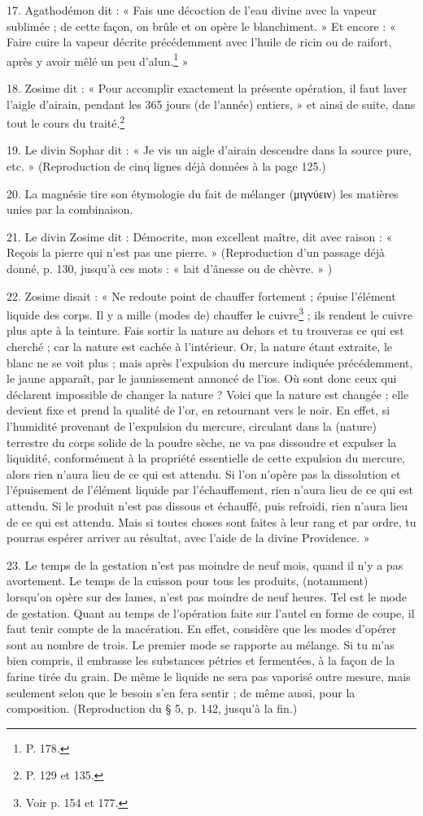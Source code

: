\documentclass[a4paper, 11pt, oneside, polutonikogreek, french]{article}
\begin{document}
17. Agathodémon dit : « Fais une décoction de l'eau divine avec la vapeur sublimée ; de cette façon, on brûle et on opère le blanchiment. » Et encore : « Faire cuire la vapeur décrite précédemment avec l'huile de ricin ou de raifort, après y avoir mêlé un peu d'alun.\footnote{P. 178.} »

18. Zosime dit : « Pour accomplir exactement la présente opération, il faut laver l'aigle d'airain, pendant les 365 jours (de l'année) entiers, » et ainsi de suite, dans tout le cours du traité.\footnote{P. 129 et 135.}

19. Le divin Sophar dit : « Je vis un aigle d'airain descendre dans la source pure, etc. » (Reproduction de cinq lignes déjà données à la page 125.)

20. La magnésie tire son étymologie du fait de mélanger (μιγνύειν) les matières unies par la combinaison.

21. Le divin Zosime dit : Démocrite, mon excellent maître, dit avec raison : « Reçois la pierre qui n'est pas une pierre. » (Reproduction d'un passage déjà donné, p. 130, jusqu'à ces mots : « lait d'ânesse ou de chèvre. » )

22. Zosime disait : « Ne redoute point de chauffer fortement ; épuise l'élément liquide des corps. Il y a mille (modes de) chauffer le cuivre\footnote{Voir p. 154 et 177.} ; ils rendent le cuivre plus apte à la teinture. Fais sortir la nature au dehors et tu trouveras ce qui est cherché ; car la nature est cachée à l'intérieur. Or, la nature étant extraite, le blanc ne se voit plus ; mais après l'expulsion du mercure indiquée précédemment, le jaune apparaît, par le jaunissement annoncé de l'ios. Où sont donc ceux qui déclarent impossible de changer la nature ? Voici que la nature est changée ; elle devient fixe et prend la qualité de l'or, en retournant vers le noir. En effet, si l'humidité provenant de l'expulsion du mercure, circulant dans la (nature) terrestre du corps solide de la poudre sèche, ne va pas dissoudre et expulser la liquidité, conformément à la propriété essentielle de cette expulsion du mercure, alors rien n'aura lieu de ce qui est attendu. Si l'on n'opère pas la dissolution et l'épuisement de l'élément liquide par l'échauffement, rien n'aura lieu de ce qui est attendu. Si le produit n'est pas dissous et échauffé, puis refroidi, rien n'aura lieu de ce qui est attendu. Mais si toutes choses sont faites à leur rang et par ordre, tu pourras espérer arriver au résultat, avec l'aide de la divine Providence. »

23. Le temps de la gestation n'est pas moindre de neuf mois, quand il n'y a pas avortement. Le temps de la cuisson pour tous les produits, (notamment) lorsqu'on opère sur des lames, n'est pas moindre de neuf heures. Tel est le mode de gestation. Quant au temps de l'opération faite sur l'autel en forme de coupe, il faut tenir compte de la macération. En effet, considère que les modes d'opérer sont au nombre de trois. Le premier mode se rapporte au mélange. Si tu m'as bien compris, il embrasse les substances pétries et fermentées, à la façon de la farine tirée du grain. De même le liquide ne sera pas vaporisé outre mesure, mais seulement selon que le besoin s'en fera sentir ; de même aussi, pour la composition. (Reproduction du § 5, p. 142, jusqu'à la fin.)
\end{document}
